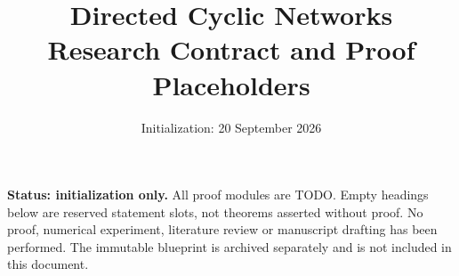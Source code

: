 \documentclass[11pt]{article}
\title{Directed Cyclic Networks\\Research Contract and Proof Placeholders}
\author{}
\date{Initialization: 20 September 2026}
\begin{document}
\maketitle
\noindent\textbf{Status: initialization only.}
All proof modules are TODO. Empty headings below are reserved statement slots,
not theorems asserted without proof. No proof, numerical experiment, literature
review or manuscript drafting has been performed. The immutable blueprint is
archived separately and is not included in this document.
\tableofcontents
\clearpage




\clearpage
\clearpage

\clearpage

\clearpage

\clearpage

\clearpage

\clearpage

\clearpage

\clearpage

\clearpage

\clearpage

\clearpage

\clearpage

\clearpage

\clearpage

\clearpage

\clearpage

\clearpage

\clearpage

\clearpage
\appendix




\end{document}
